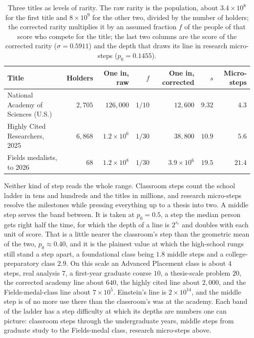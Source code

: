 \documentclass{article}
\begin{document}
\begin{table}[ht]
  \centering
  \caption{Three titles as levels of rarity. The raw rarity is the population, about $3.4 \times 10^{8}$ for the first title and $8 \times 10^{9}$ for the other two, divided by the number of holders; the corrected rarity multiplies it by an assumed fraction $f$ of the people of that score who compete for the title; the last two columns are the score of the corrected rarity ($\sigma = 0.5911$) and the depth that draws its line in research micro-steps ($p_0 = 0.1455$).}
  \label{tab:titles}
  \medskip\small\setlength{\tabcolsep}{3.5pt}
  \begin{tabular}{l r r r r r r}
    \hline
    Title & Holders & One in, raw & $f$ & One in, corrected & $s$ & Micro-steps \\
    \hline
    National Academy of Sciences (U.S.) & $2{,}705$ & $126{,}000$ & $1/10$ & $12{,}600$ & $9.32$ & $4.3$ \\
    Highly Cited Researchers, 2025 & $6{,}868$ & $1.2 \times 10^{6}$ & $1/30$ & $38{,}800$ & $10.9$ & $5.6$ \\
    Fields medalists, to 2026 & $68$ & $1.2 \times 10^{8}$ & $1/30$ & $3.9 \times 10^{6}$ & $19.5$ & $21.4$ \\
    \hline
  \end{tabular}
\end{table}

Neither kind of step reads the whole range. Classroom steps count the school ladder in tens and hundreds and the titles in millions, and research micro-steps resolve the milestones while pressing everything up to a thesis into two. A middle step serves the band between. It is taken at $p_0 = 0.5$, a step the median person gets right half the time, for which the depth of a line is $2^{s_c}$ and doubles with each unit of score. That is a little nearer the classroom's step than the geometric mean of the two, $p_0 \approx 0.40$, and it is the plainest value at which the high-school rungs still stand a step apart, a foundational class being $1.8$ middle steps and a college-preparatory class $2.9$. On this scale an Advanced Placement class is about $4$ steps, real analysis $7$, a first-year graduate course $10$, a thesis-scale problem $20$, the corrected academy line about $640$, the highly cited line about $2{,}000$, and the Fields-medal-class line about $7 \times 10^{5}$. Einstein's line is $2 \times 10^{14}$, and the middle step is of no more use there than the classroom's was at the academy. Each band of the ladder has a step difficulty at which its depths are numbers one can picture: classroom steps through the undergraduate years, middle steps from graduate study to the Fields-medal class, research micro-steps above.
\end{document}
